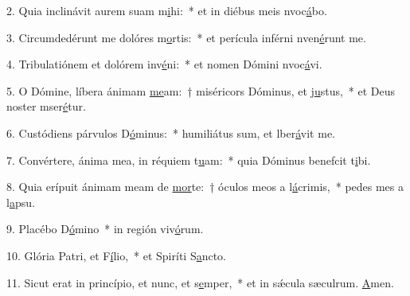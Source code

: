 2. Quia inclinávit aurem suam m\uline{i}hi:~* et in diébus meis nvoc\uline{á}bo.\par 
3. Circumdedérunt me dolóres m\uline{o}rtis:~* et perícula inférni nven\uline{é}runt me.\par 
4. Tribulatiónem et dolórem inv\uline{é}ni:~* et nomen Dómini nvoc\uline{á}vi.\par 
5. O Dómine, líbera ánimam \uline{me}am:~† miséricors Dóminus, et j\uline{u}stus,~* et Deus noster mser\uline{é}tur.\par 
6. Custódiens párvulos D\uline{ó}minus:~* humiliátus sum, et lber\uline{á}vit me.\par 
7. Convértere, ánima mea, in réquiem t\uline{u}am:~* quia Dóminus benefcit t\uline{i}bi.\par 
8. Quia erípuit ánimam meam de \uline{mor}te:~† óculos meos a l\uline{á}crimis,~* pedes mes a l\uline{a}psu.\par 
9. Placébo D\uline{ó}mino~* in región viv\uline{ó}rum.\par 
10. Glória Patri, et F\uline{í}lio,~* et Spiríti S\uline{a}ncto.\par 
11. Sicut erat in princípio, et nunc, et s\uline{e}mper,~* et in sǽcula sæculrum. \uline{A}men.\par 
